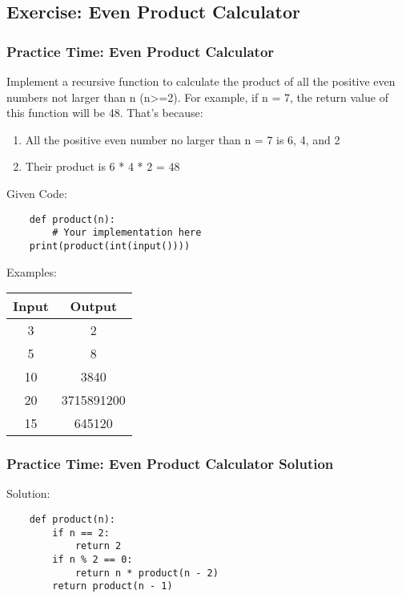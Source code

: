 \documentclass{beamer}
\begin{document}
\subsection{Exercise: Even Product Calculator}
\begin{frame}[fragile]
    \frametitle{Practice Time: Even Product Calculator}

    Implement a recursive function to calculate the product of
    all the positive even numbers not larger than n (n>=2).
    For example, if n = 7, the return value of this function will be 48.
    That’s because:
    \begin{enumerate}
        \item All the positive even number no larger than n = 7 is 6, 4, and 2
        \item Their product is 6 * 4 * 2 = 48
    \end{enumerate}
    Given Code:
    \begin{verbatim}
    def product(n):
        # Your implementation here
    print(product(int(input())))
    \end{verbatim}
    Examples:

    \begin{center}
        \small
        \begin{tabular}{|c|c|}
            \hline
            Input & Output     \\ \hline
            3     & 2          \\ \hline
            5     & 8          \\ \hline
            10    & 3840       \\ \hline
            20    & 3715891200 \\ \hline
            15    & 645120     \\ \hline
        \end{tabular}
    \end{center}
\end{frame}

\begin{frame}[fragile]
    \frametitle{Practice Time: Even Product Calculator Solution}

    Solution:
    \begin{verbatim}
    def product(n):
        if n == 2:
            return 2
        if n % 2 == 0:
            return n * product(n - 2)
        return product(n - 1)
    \end{verbatim}
\end{frame}
\end{document}
